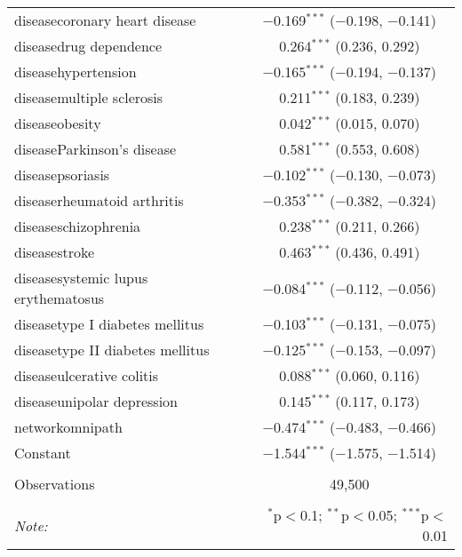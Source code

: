 \begin{table}[!htbp]
\begin{tabular}{@{\extracolsep{5pt}}lc}
  diseasecoronary heart disease & $-$0.169$^{***}$ ($-$0.198, $-$0.141) \\ 
  diseasedrug dependence & 0.264$^{***}$ (0.236, 0.292) \\ 
  diseasehypertension & $-$0.165$^{***}$ ($-$0.194, $-$0.137) \\ 
  diseasemultiple sclerosis & 0.211$^{***}$ (0.183, 0.239) \\ 
  diseaseobesity & 0.042$^{***}$ (0.015, 0.070) \\ 
  diseaseParkinson's disease & 0.581$^{***}$ (0.553, 0.608) \\ 
  diseasepsoriasis & $-$0.102$^{***}$ ($-$0.130, $-$0.073) \\ 
  diseaserheumatoid arthritis & $-$0.353$^{***}$ ($-$0.382, $-$0.324) \\ 
  diseaseschizophrenia & 0.238$^{***}$ (0.211, 0.266) \\ 
  diseasestroke & 0.463$^{***}$ (0.436, 0.491) \\ 
  diseasesystemic lupus erythematosus & $-$0.084$^{***}$ ($-$0.112, $-$0.056) \\ 
  diseasetype I diabetes mellitus & $-$0.103$^{***}$ ($-$0.131, $-$0.075) \\ 
  diseasetype II diabetes mellitus & $-$0.125$^{***}$ ($-$0.153, $-$0.097) \\ 
  diseaseulcerative colitis & 0.088$^{***}$ (0.060, 0.116) \\ 
  diseaseunipolar depression & 0.145$^{***}$ (0.117, 0.173) \\ 
  networkomnipath & $-$0.474$^{***}$ ($-$0.483, $-$0.466) \\ 
  Constant & $-$1.544$^{***}$ ($-$1.575, $-$1.514) \\ 
 \hline \\[-1.8ex] 
Observations & 49,500 \\ 
\hline 
\hline \\[-1.8ex] 
\textit{Note:}  & \multicolumn{1}{r}{$^{*}$p$<$0.1; $^{**}$p$<$0.05; $^{***}$p$<$0.01} \\ 
\end{tabular} 
\end{table} 
